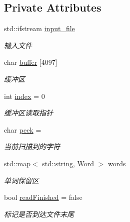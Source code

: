 \subsection*{Private Attributes}
\begin{DoxyCompactItemize}
\item 
\mbox{\label{class_lexer_a606dd5cec5ec316ca1b1df40823fb853}} 
std\+::ifstream \hyperlink{class_lexer_a606dd5cec5ec316ca1b1df40823fb853}{input\+\_\+file}
\begin{DoxyCompactList}\small\item\em 输入文件 \end{DoxyCompactList}\item 
\mbox{\label{class_lexer_a372c56c466c70d808bdcdb11e94bd914}} 
char \hyperlink{class_lexer_a372c56c466c70d808bdcdb11e94bd914}{buffer} \mbox{[}4097\mbox{]}
\begin{DoxyCompactList}\small\item\em 缓冲区 \end{DoxyCompactList}\item 
\mbox{\label{class_lexer_a266317e9b89ad0e681fdb21032ef00f8}} 
int \hyperlink{class_lexer_a266317e9b89ad0e681fdb21032ef00f8}{index} = 0
\begin{DoxyCompactList}\small\item\em 缓冲区读取指针 \end{DoxyCompactList}\item 
\mbox{\label{class_lexer_a1c13ae056a34e7ec483c561152bb8d49}} 
char \hyperlink{class_lexer_a1c13ae056a34e7ec483c561152bb8d49}{peek} = \textquotesingle{} \textquotesingle{}
\begin{DoxyCompactList}\small\item\em 当前扫描到的字符 \end{DoxyCompactList}\item 
\mbox{\label{class_lexer_add52df03b8546bfe059f4e1832141c16}} 
std\+::map$<$ std\+::string, \hyperlink{class_word}{Word} $>$ \hyperlink{class_lexer_add52df03b8546bfe059f4e1832141c16}{words}
\begin{DoxyCompactList}\small\item\em 单词保留区 \end{DoxyCompactList}\item 
\mbox{\label{class_lexer_a123d0134daef2ce492f0707342456afc}} 
bool \hyperlink{class_lexer_a123d0134daef2ce492f0707342456afc}{read\+Finished} = false
\begin{DoxyCompactList}\small\item\em 标记是否到达文件末尾 \end{DoxyCompactList}\end{DoxyCompactItemize}
